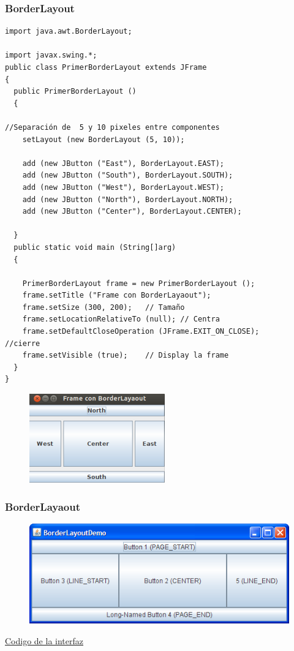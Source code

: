 \documentclass{beamer}
\begin{document}
\begin{frame}[fragile]
\frametitle{BorderLayout}
\begin{multicols}{2}
\begin{tiny}
\begin{verbatim}
import java.awt.BorderLayout;

import javax.swing.*;
public class PrimerBorderLayout extends JFrame
{
  public PrimerBorderLayout ()
  {

//Separación de  5 y 10 pixeles entre componentes
    setLayout (new BorderLayout (5, 10));

    add (new JButton ("East"), BorderLayout.EAST);
    add (new JButton ("South"), BorderLayout.SOUTH);
    add (new JButton ("West"), BorderLayout.WEST);
    add (new JButton ("North"), BorderLayout.NORTH);
    add (new JButton ("Center"), BorderLayout.CENTER);

  }
  public static void main (String[]arg)
  {

    PrimerBorderLayout frame = new PrimerBorderLayout ();
    frame.setTitle ("Frame con BorderLayaout");
    frame.setSize (300, 200);   // Tamaño
    frame.setLocationRelativeTo (null); // Centra
    frame.setDefaultCloseOperation (JFrame.EXIT_ON_CLOSE);      //cierre
    frame.setVisible (true);    // Display la frame
  }
}
\end{verbatim}
\end{tiny}
\begin{figure}
\includegraphics[scale=0.6]{imagenes/borderlayout.png}
\end{figure}
\end{multicols}
\end{frame}


\begin{frame}[fragile]
    \frametitle{BorderLayaout}
  \begin{figure}
\includegraphics[scale=0.7]{imagenes/bl.png}
\end{figure}  
\begin{center}{\color{blue}
\href{https://docs.oracle.com/javase/tutorial/displayCode.html?code=https://docs.oracle.com/javase/tutorial/uiswing/examples/layout/BorderLayoutDemoProject/src/layout/BorderLayoutDemo.java}
{Codigo de la interfaz}}
\end{center}
\end{frame}
\end{document}
